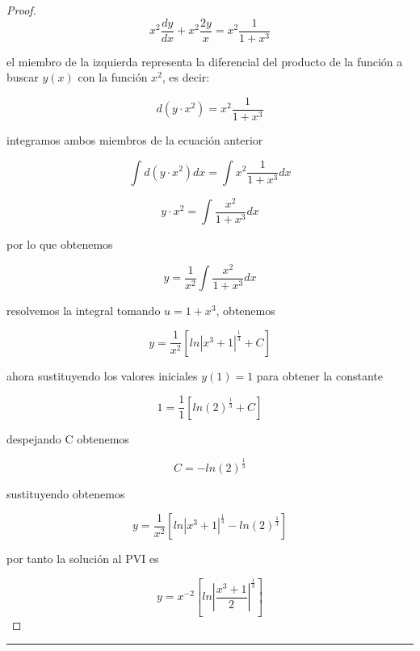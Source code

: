 \begin{itemize}
\begin{proof}
$$x^2\frac{dy}{dx}+x^2\frac{2y}{x}=x^2\frac{1}{1+x^3}$$

el miembro de la izquierda representa la diferencial del producto de la función a buscar $y(x)$ con la función $x^2$, es decir:

$$d(y\cdot x^2)=x^2\frac{1}{1+x^3}$$

integramos ambos miembros de la ecuación anterior 

$$\int d(y\cdot x^2)dx=\int x^2\frac{1}{1+x^3}dx$$

$$y\cdot x^2=\int \frac{x^2}{1+x^3}dx$$

por lo que obtenemos

$$y=\frac{1}{x^2}\int \frac{x^2}{1+x^3}dx$$

resolvemos la integral tomando $u=1+x^3$, obtenemos

$$y=\frac{1}{x^2}\left[ln|x^3+1|^{\frac{1}{3}}+C\right]$$

ahora sustituyendo los valores iniciales $y(1)=1$ para obtener la constante 

$$1=\frac{1}{1}\left[ln(2)^{\frac{1}{3}}+C\right]$$

despejando C obtenemos

$$C=-ln(2)^{\frac{1}{3}}$$

sustituyendo obtenemos

$$y=\frac{1}{x^2}\left[ln|x^3+1|^{\frac{1}{3}}-ln(2)^{\frac{1}{3}}\right]$$

por tanto la solución al PVI es

$$y=x^{-2}\left[ ln|\frac{x^3+1}{2}|^{\frac{1}{3}} \right]$$
  
  
\end{proof}

 
\end{itemize}

\rule[2ex]{\textwidth}{2pt}\\





